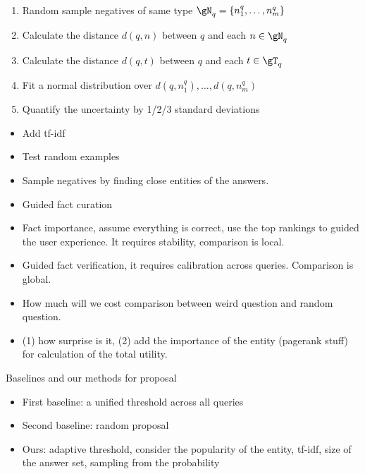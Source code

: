 \begin{enumerate}[noitemsep,topsep=0pt,parsep=1pt,partopsep=0pt, leftmargin=*]
    \item {\color{blue} Random sample negatives of same type $\gN_q=\{n_1^q, \dots, n_m^q\}$}
    \item {\color{blue} Calculate the distance $d(q,n)$ between $q$ and each $n \in \gN_q$}
    \item Calculate the distance $d(q,t)$ between $q$ and each $t \in \gT_q$
    \item Fit a normal distribution over {\color{red} $d(q,n_1^q), \dots, d(q,n_m^q)$}
    \item Quantify the uncertainty by 1/2/3 standard deviations
\end{enumerate}

\newpage
\begin{itemize}
    \item Add tf-idf
    \item Test random examples
    \item Sample negatives by finding close entities of the answers.
\end{itemize}

\begin{itemize}
    \item Guided fact curation
    \item Fact importance, assume everything is correct, use the top rankings to guided the user experience. It requires stability, comparison is local.
    \item Guided fact verification, it requires calibration across queries. Comparison is global.
    \item How much will we cost comparison between weird question and random question.
    \item (1) how surprise is it, (2) add the importance of the entity (pagerank stuff) for calculation of the total utility.
\end{itemize}

Baselines and our methods for proposal
\begin{itemize}
    \item First baseline: a unified threshold across all queries
    \item Second baseline: random proposal
    \item Ours: adaptive threshold, consider the popularity of the entity, tf-idf, size of the answer set, sampling from the probability
\end{itemize}

